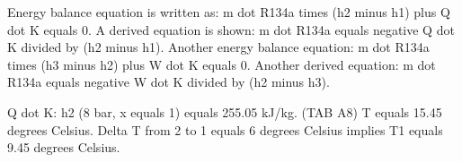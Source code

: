 Energy balance equation is written as: m dot R134a times (h2 minus h1) plus Q dot K equals 0. 
A derived equation is shown: m dot R134a equals negative Q dot K divided by (h2 minus h1).
Another energy balance equation: m dot R134a times (h3 minus h2) plus W dot K equals 0.
Another derived equation: m dot R134a equals negative W dot K divided by (h2 minus h3).

Q dot K: h2 (8 bar, x equals 1) equals 255.05 kJ/kg.
(TAB A8) T equals 15.45 degrees Celsius.
Delta T from 2 to 1 equals 6 degrees Celsius implies T1 equals 9.45 degrees Celsius.